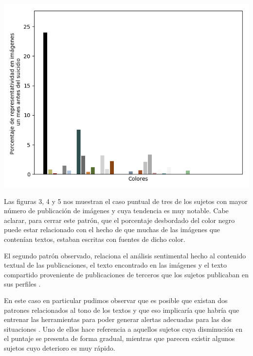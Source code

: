 \documentclass[12pt, donotrepeattitle, jou]{apa6}
\begin{document}
\begin{center}
\begin{minipage}{0.3\linewidth}
        \end{minipage}
        \begin{minipage}{0.3\linewidth}
            \includegraphics[width=\linewidth]{images/colors_gabriel}
        \end{minipage}
    \end{center}
    
    Las figuras 3, 4 y 5 nos muestran el caso puntual de tres de los sujetos con mayor número de publicación de imágenes y cuya tendencia es muy notable. Cabe aclarar, para cerrar este patrón, que el porcentaje desbordado del color negro puede estar relacionado con el hecho de que muchas de las imágenes que contenían textos, estaban escritas con fuentes de dicho color.
    
    El segundo patrón observado, relaciona el análisis sentimental hecho al contenido textual de las publicaciones, el texto encontrado en las imágenes y el texto compartido proveniente de publicaciones de terceros que los sujetos publicaban en sus perfiles \parencite{Twitter}.
    
    En este caso en particular pudimos observar que es posible que existan dos patrones relacionados al tono de los textos y que eso implicaría que habría que entrenar las herramientas para poder generar alertas adecuadas para las dos situaciones \parencite{TextAnalysis}. Uno de ellos hace referencia a aquellos sujetos cuya disminución en el puntaje se presenta de forma gradual, mientras que parecen existir algunos sujetos cuyo deterioro es muy rápido.
    
\end{document}
